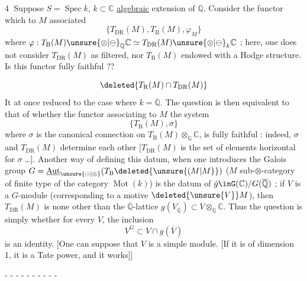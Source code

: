 \textcircled{4}  Suppose $S=\operatorname{Spec}k$, $k\subset\mathbb C$ \uline{algebraic} extension of $\mathbb Q$. Consider the functor which to $M$ associated
\begingroup\makeatletter\tagsleft@true\makeatother
\[
\bigl\{T_{\mathrm{DR}}(M),T_{\mathrm B}(M),\varphi_M\bigr\} \tag*{(4.1)}
\]
\endgroup
where $\varphi:T_{\mathrm B}(M)\unsure{\otimes|\ominus}_{\mathbb Q}\mathbb C\simeq T_{\mathrm{DR}}(M)\unsure{\otimes|\ominus}_k\mathbb C$ ; here, one does not consider $T_{\mathrm{DR}}(M)$ as filtered,  nor $T_{\mathrm B}(M)$ endowed with a Hodge structure. Is this functor fully faithful ??

\[
\deleted{T_{\mathrm R}(M)\cap T_{\mathrm{DR}}(M)}
\]
It  at once reduced to the case where $k=\overline{\mathbb Q}$. The question is then equivalent to that of whether the functor associating to $M$ the system
\begingroup\makeatletter\tagsleft@true\makeatother
\[
\bigl\{T_{\mathrm B}(M),\sigma\bigr\} \tag*{(4.2)}
\]
\endgroup
where $\sigma$ is the canonical connection on $T_{\mathrm B}(M)\otimes_{\mathbb Q}\mathbb C$, is fully faithful : indeed, $\sigma$ and $T_{\mathrm{DR}}(M)$ determine each other [$T_{\mathrm{DR}}(M)$ is the set of elements  horizontal for $\sigma$ \ldots].
Another way of defining this datum,  when one introduces the Galois group $G=\underline{\operatorname{Aut}}_{\unsure{\ominus|\otimes}}(T_{\mathrm B}\deleted{\unsure{(M|M}})$  ($M$ sub-$\otimes$-category of finite type of the category $\operatorname{Mot}(k)$) is the datum of $\dot g\inG(\mathbb C)/G(\overline{\mathbb Q})$ ; if $V$ is a $G$-module (corresponding to a motive $\deleted{\unsure{V}}M$), then
$T_{\mathrm{DR}}(M)$ is none other than the $\overline{\mathbb Q}$-lattice $g(V_{\overline{\mathbb Q}})\subset V\otimes_{\mathbb Q}\mathbb C$. Thus the question is simply whether for every $V$, the inclusion
\[
V^G\subset V\cap g(\overline V)
\]
is an identity. [One can suppose that $V$ is a simple module. [If it is of dimension 1, it is a Tate power, and it works]] 
\par\hfill - - - - - - - - - -
